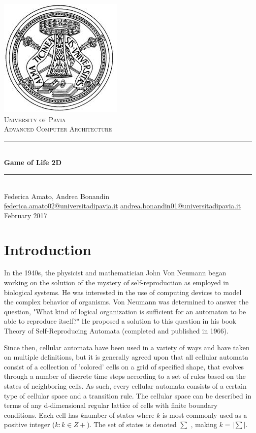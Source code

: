 \documentclass[a4paper,11pt,twoside]{report}
\begin{document}
\begin{titlepage}
	\centering
	\includegraphics[scale = 0.4]{logo.jpeg}\\[1.0 cm]
	\textsc{\LARGE University of Pavia}\\[1.0 cm]
	\textsc{\Large Advanced Computer Architecture}\\[0.5 cm]
	\rule{\linewidth}{0.2 mm} \\[0.4 cm]
	{\huge{\textbf{Game of Life 2D}}}\\
	\rule{\linewidth}{0.2 mm} \\[1 cm]

	{\large Federica Amato, Andrea Bonandin} \\[0.2 cm]
	\url{federica.amato02@universitadipavia.it}
	\url{andrea.bonandin01@universitadipavia.it} \\[0.2 cm]
	{February 2017}
\end{titlepage}

\tableofcontents

\chapter{Introduction}
In the 1940s, the physicist and mathematician John Von Neumann began working
on the solution of the mystery of self-reproduction as employed in biological systems. He was
interested in the use of computing devices to model the complex behavior of organisms.
Von Neumann was determined to answer the question, "What kind of logical organization is sufficient for an automaton to be able to reproduce itself?" He proposed a solution to this question in
his book Theory of Self-Reproducing Automata (completed and published in 1966).

\noindent Since then, cellular automata have been used in a variety of ways and have taken on multiple definitions, but it is generally agreed upon that all cellular automata consist of a collection of 'colored' cells on a grid of specified shape, that evolves through a number of discrete time steps according to a set of rules based on the states of neighboring cells. As such, every cellular automata consists of a certain type of cellular space and a transition rule. The cellular space can
be described in terms of any d-dimensional regular lattice of cells with finite boundary conditions.
Each cell has $k $number of states where $k$ is most commonly used as a positive integer ($k : k \in Z+$). The set of states is denoted $\sum$ , making $k = |\sum|$. 
\end{document}
